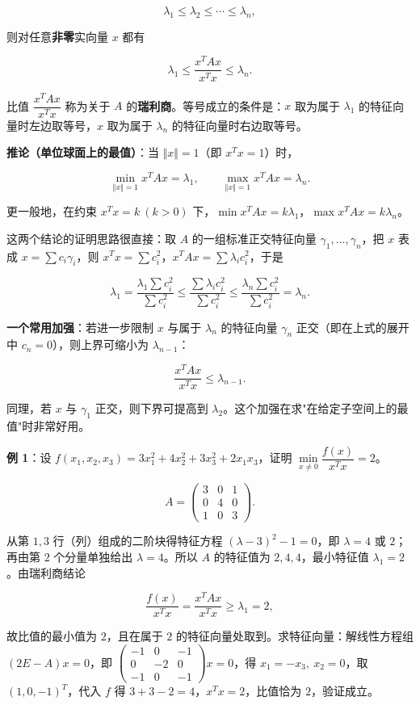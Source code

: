 \documentclass[11pt,openany,UTF8]{ctexbook}
\begin{document}
\[\lambda_1\leq\lambda_2\leq\cdots\leq\lambda_n,\]

则对任意\textbf{非零}实向量 $x$ 都有

\[\lambda_1\leq\frac{x^TAx}{x^Tx}\leq\lambda_n .\]

比值 $\dfrac{x^TAx}{x^Tx}$ 称为关于 $A$ 的\textbf{瑞利商}。等号成立的条件是：$x$ 取为属于 $\lambda_1$ 的特征向量时左边取等号，$x$ 取为属于 $\lambda_n$ 的特征向量时右边取等号。

\textbf{推论（单位球面上的最值）}：当 $\Vert x\Vert=1$（即 $x^Tx=1$）时，

\[\min_{\Vert x\Vert=1}x^TAx=\lambda_1,\qquad \max_{\Vert x\Vert=1}x^TAx=\lambda_n .\]

更一般地，在约束 $x^Tx=k\ (k>0)$ 下，$\min x^TAx=k\lambda_1$，$\max x^TAx=k\lambda_n$。

这两个结论的证明思路很直接：取 $A$ 的一组标准正交特征向量 $\gamma_1,\dots,\gamma_n$，把 $x$ 表成 $x=\sum c_i\gamma_i$，则 $x^Tx=\sum c_i^2$，$x^TAx=\sum\lambda_ic_i^2$，于是

\[\lambda_1=\frac{\lambda_1\sum c_i^2}{\sum c_i^2}\leq\frac{\sum\lambda_ic_i^2}{\sum c_i^2}\leq\frac{\lambda_n\sum c_i^2}{\sum c_i^2}=\lambda_n .\]

\textbf{一个常用加强}：若进一步限制 $x$ 与属于 $\lambda_n$ 的特征向量 $\gamma_n$ 正交（即在上式的展开中 $c_n=0$），则上界可缩小为 $\lambda_{n-1}$：

\[\frac{x^TAx}{x^Tx}\leq\lambda_{n-1}.\]

同理，若 $x$ 与 $\gamma_1$ 正交，则下界可提高到 $\lambda_2$。这个加强在求"在给定子空间上的最值"时非常好用。

\textbf{例 1}：设 $f(x_1,x_2,x_3)=3x_1^2+4x_2^2+3x_3^2+2x_1x_3$，证明 $\min\limits_{x\neq0}\dfrac{f(x)}{x^Tx}=2$。

\[A=\begin{pmatrix}3&0&1\\0&4&0\\1&0&3\end{pmatrix}.\]

从第 $1,3$ 行（列）组成的二阶块得特征方程 $(\lambda-3)^2-1=0$，即 $\lambda=4$ 或 $2$；再由第 $2$ 个分量单独给出 $\lambda=4$。所以 $A$ 的特征值为 $2,4,4$，最小特征值 $\lambda_1=2$。由瑞利商结论

\[\frac{f(x)}{x^Tx}=\frac{x^TAx}{x^Tx}\geq\lambda_1=2,\]

故比值的最小值为 $2$，且在属于 $2$ 的特征向量处取到。求特征向量：解线性方程组 $(2E-A)x=0$，即 $\begin{pmatrix}-1&0&-1\\0&-2&0\\-1&0&-1\end{pmatrix}x=0$，得 $x_1=-x_3,\ x_2=0$，取 $(1,0,-1)^T$，代入 $f$ 得 $3+3-2=4$，$x^Tx=2$，比值恰为 $2$，验证成立。
\end{document}
